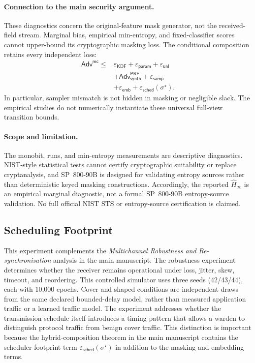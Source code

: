 \documentclass[journal]{IEEEtran}
\theoremstyle{definition}
\theoremstyle{game}
\begin{document}
\paragraph{Connection to the main security argument.}
These diagnostics concern the original-feature mask generator,
not the received-field stream. Marginal bias, empirical min-entropy,
and fixed-classifier scores cannot upper-bound its cryptographic masking
loss. The conditional composition retains every independent loss:
\begin{align}\label{eq:supp_mask_composition_link}
\mathsf{Adv}^{\mathsf{mc}}\le{}&\varepsilon_{\mathsf{KDF}}+
 \varepsilon_{\mathsf{param}}+\varepsilon_{\mathsf{unl}}\nonumber\\
&+\mathsf{Adv}^{\mathsf{PRF}}_{\mathsf{synth}}+\varepsilon_{\mathsf{samp}}\nonumber\\
&+\varepsilon_{\mathsf{emb}}+\varepsilon_{\mathsf{sched}}(\sigma^\star).
\end{align}
In particular, sampler mismatch is not hidden in masking or negligible
slack. The empirical studies do not numerically instantiate these universal
full-view transition bounds.

\paragraph{Scope and limitation.}
The monobit, runs, and min-entropy measurements are descriptive diagnostics.
NIST-style statistical tests cannot certify cryptographic suitability or
replace cryptanalysis, and SP~800-90B is designed for validating entropy
sources rather than deterministic keyed masking constructions. Accordingly,
the reported $\widehat H_{\infty}$ is an empirical marginal diagnostic, not a
formal SP~800-90B entropy-source validation. No full official NIST STS or entropy-source certification is claimed.

\subsection{Scheduling Footprint}
\label{supp-subsec:scheduling_footprint}

This experiment complements the \emph{Multichannel Robustness and
Re-synchronisation} analysis in the main manuscript. The robustness
experiment determines whether the receiver remains operational under
loss, jitter, skew, timeout, and reordering. This controlled simulator uses three seeds (42/43/44), each with
10,000 epochs. Cover and shaped conditions are independent draws from
the same declared bounded-delay model, rather than measured application
traffic or a learned traffic model. The experiment addresses whether the transmission schedule itself
introduces a timing pattern that allows a warden to distinguish protocol
traffic from benign cover traffic. This distinction is important because
the hybrid-composition theorem in the main manuscript contains the
scheduler-footprint term
$\varepsilon_{\mathsf{sched}}(\sigma^\star)$ in addition to the masking
and embedding terms.
\end{document}

